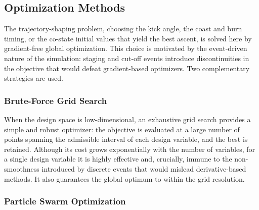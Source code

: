 \subsection{Optimization Methods}
\label{ssec:optimization}

The trajectory-shaping problem, choosing the kick angle, the coast and burn timing, or the co-state initial values that yield the best ascent, is solved here by gradient-free global optimization. This choice is motivated by the event-driven nature of the simulation: staging and cut-off events introduce discontinuities in the objective that would defeat gradient-based optimizers. Two complementary strategies are used.


\subsubsection{Brute-Force Grid Search}

When the design space is low-dimensional, an exhaustive grid search provides a simple and robust optimizer: the objective is evaluated at a large number of points spanning the admissible interval of each design variable, and the best is retained. Although its cost grows exponentially with the number of variables, for a single design variable it is highly effective and, crucially, immune to the non-smoothness introduced by discrete events that would mislead derivative-based methods. It also guarantees the global optimum to within the grid resolution.


\subsubsection{Particle Swarm Optimization}

